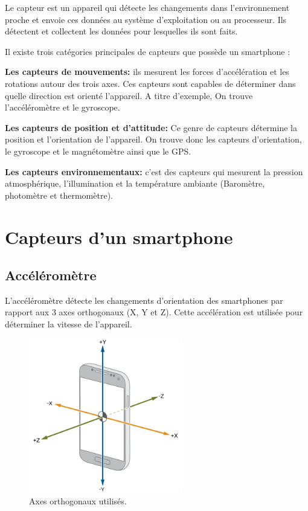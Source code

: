 Le capteur est un appareil qui détecte les changements dans l'environnement proche et envoie ces données au système d'exploitation ou au processeur. Ils détectent et collectent les données pour lesquelles ils sont faits.

Il existe trois catégories principales de capteurs que possède un smartphone \cite{tilluMobileSensorsComponents2019}:

{\bf Les capteurs de mouvements:}
ils mesurent les forces d'accélération et les rotations autour des trois axes.  Ces capteurs sont capables de déterminer dans quelle direction est orienté l’appareil. A titre d’exemple, On trouve l'accéléromètre et le gyroscope.

    {\bf Les capteurs de position et d’attitude:}
Ce genre de capteurs détermine la position et l’orientation de l'appareil. On trouve donc les capteurs d’orientation, le gyroscope et le magnétomètre ainsi que le GPS.

    {\bf Les capteurs environnementaux:}
c’est des capteurs qui mesurent la pression atmosphérique, l'illumination et la température ambiante (Baromètre, photomètre et thermomètre).

\section{Capteurs d'un smartphone}

\subsection{Accéléromètre}
L'accéléromètre détecte les changements d'orientation des smartphones par rapport aux 3 axes orthogonaux (X, Y et Z). Cette accélération est utilisée pour déterminer la vitesse de l’appareil.

\begin{figure}[h!]
    \center
    \includegraphics[width=0.60\textwidth]{Images/chapter1/axes.png}
    \caption{Axes orthogonaux utilisés.}
    \label{fig:axis}
\end{figure}

